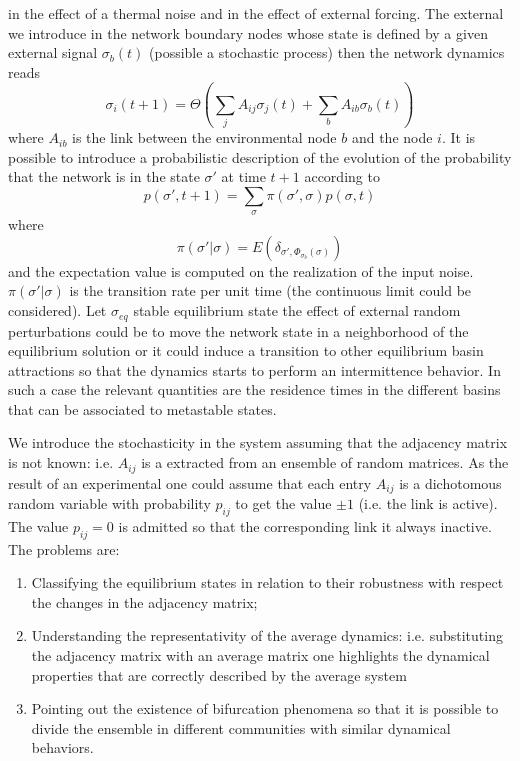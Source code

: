 in the effect of a thermal noise and in the effect of external forcing. The external  we introduce in the network boundary nodes whose state is defined by a given external signal
$\sigma_b(t)$ (possible a stochastic process) then the network dynamics reads
$$
\sigma_i(t+1)=\Theta\left (\sum_j A_{ij}\sigma_j(t)+\sum_b A_{ib}\sigma_b(t)\right )
$$
where $A_{ib}$ is the link between the environmental node $b$ and the node $i$. It is possible to introduce a probabilistic description of the evolution
of the probability that the network is in the state $\sigma'$ at time $t+1$ according to
\begin{equation}
p(\sigma',t+1)=\sum_{\sigma}\pi(\sigma',\sigma)p(\sigma,t)
\label{lapla}
\end{equation}
where
$$
\pi(\sigma'|\sigma)=E\left (\delta_{\sigma',\Phi_{\sigma_b}(\sigma)} \right )
$$
and the expectation value is computed on the realization of the input noise. $\pi(\sigma'|\sigma)$ is the transition rate per unit time (the continuous limit could be considered).
Let $\sigma_{eq}$ stable equilibrium state the effect of external random perturbations could be to move the network state in a neighborhood of the equilibrium solution
or it could induce a transition to other equilibrium basin attractions so that the dynamics starts to perform an intermittence behavior. In such a case the relevant quantities are  
the residence times in the different basins that can be associated to metastable states.
\par\noindent
We introduce the stochasticity in the system assuming that the adjacency matrix is not known: i.e. $A_{ij}$ is a extracted from an ensemble of random matrices.
As the result of an experimental one could assume that each entry $A_{ij}$ is a dichotomous random variable with probability $p_{ij}$ to get the value $\pm 1$ (i.e. the
link is active). The value $p_{ij}=0$ is admitted so that the corresponding link it always inactive. The problems are:
\begin{enumerate}
    	\item Classifying the equilibrium states in relation to their robustness with respect the changes in the adjacency matrix;
     \item Understanding the representativity of the average dynamics: i.e. substituting the adjacency matrix with an average matrix one highlights the dynamical properties 
     that are correctly described by the average system
     \item Pointing out the existence of bifurcation phenomena so that it is possible to divide the ensemble in different communities with similar dynamical behaviors.
\end{enumerate}

